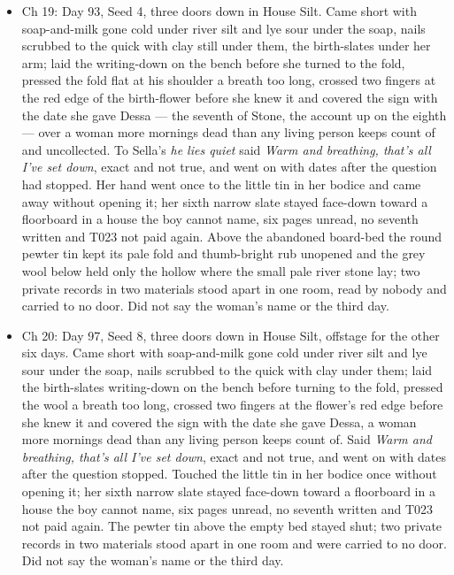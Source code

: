 \documentclass{design/chronicle}
\begin{document}
{\begin{itemize}[leftmargin=1.4em,itemsep=1pt,topsep=3pt,parsep=0pt]
\item Ch 19: Day 93, Seed 4, three doors down in House Silt. Came short with soap-and-milk gone cold under river silt and lye sour under the soap, nails scrubbed to the quick with clay still under them, the birth-slates under her arm; laid the writing-down on the bench before she turned to the fold, pressed the fold flat at his shoulder a breath too long, crossed two fingers at the red edge of the birth-flower before she knew it and covered the sign with the date she gave Dessa --- the seventh of Stone, the account up on the eighth --- over a woman more mornings dead than any living person keeps count of and uncollected. To Sella’s \emph{he lies quiet} said \emph{Warm and breathing, that’s all I’ve set down}, exact and not true, and went on with dates after the question had stopped. Her hand went once to the little tin in her bodice and came away without opening it; her sixth narrow slate stayed face-down toward a floorboard in a house the boy cannot name, six pages unread, no seventh written and T023 not paid again. Above the abandoned board-bed the round pewter tin kept its pale fold and thumb-bright rub unopened and the grey wool below held only the hollow where the small pale river stone lay; two private records in two materials stood apart in one room, read by nobody and carried to no door. Did not say the woman’s name or the third day.

\end{itemize}

\begin{itemize}[leftmargin=1.4em,itemsep=1pt,topsep=3pt,parsep=0pt]

\item Ch 20: Day 97, Seed 8, three doors down in House Silt, offstage for the other six days. Came short with soap-and-milk gone cold under river silt and lye sour under the soap, nails scrubbed to the quick with clay under them; laid the birth-slates writing-down on the bench before turning to the fold, pressed the wool a breath too long, crossed two fingers at the flower’s red edge before she knew it and covered the sign with the date she gave Dessa, a woman more mornings dead than any living person keeps count of. Said \emph{Warm and breathing, that’s all I’ve set down}, exact and not true, and went on with dates after the question stopped. Touched the little tin in her bodice once without opening it; her sixth narrow slate stayed face-down toward a floorboard in a house the boy cannot name, six pages unread, no seventh written and T023 not paid again. The pewter tin above the empty bed stayed shut; two private records in two materials stood apart in one room and were carried to no door. Did not say the woman’s name or the third day.


\end{itemize}}
\end{document}
